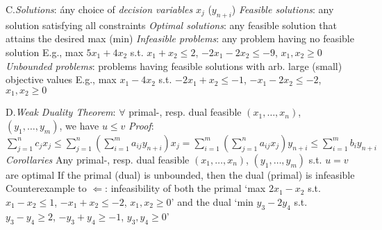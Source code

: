 \item{C.}\emph{Solutions}: \'any choice of \emph{decision variables} $x_j$
($y_{n+i}$)\smallskip
{}\emph{Feasible solutions}: any solution satisfying all constraints
\smallskip
{}\emph{Optimal solutions}: any feasible solution that attains the
desired max (min)\smallskip
{}\emph{Infeasible problems}: any problem having no feasible solution
\smallskip
{}E.g., max $5x_1+4x_2$ s.t. $x_1+x_2\leq 2$, $-2x_1-2x_2\leq-9$,
$x_1,x_2\geq 0$\smallskip
{}\emph{Unbounded problems}: problems having feasible solutions with
arb. large (small) objective values\smallskip
{}E.g., max $x_1-4x_2$ s.t. $-2x_1+x_2\leq -1$, $-x_1-2x_2\leq-2$,
$x_1,x_2\geq 0$\smallskip

\item{D.}\emph{Weak Duality Theorem}: $\forall$ primal-, resp. dual feasible
$(x_1,\ldots,x_n)$, $(y_1,\ldots,y_m)$, we have $u\leq v$\smallskip
{}\emph{Proof}: $\sum_{j=1}^nc_jx_j\leq\sum_{j=1}^n\left(\sum_{i=1}^m
a_{ij}y_{n+i}\right)x_j=\sum_{i=1}^m\left(\sum_{j=1}^na_{ij}x_j\right)y_{n+i}\leq
\sum_{i=1}^mb_iy_{n+i}$\smallskip
{}\emph{Corollaries}\smallskip
{}Any primal-, resp. dual feasible $(x_1,\ldots,x_n)$, $(y_1,\ldots,
y_m)$ s.t. $u=v$ are optimal\smallskip
{}If the primal (dual) is unbounded, then the dual (primal) is
infeasible\smallskip
{}Counterexample to $\Leftarrow$: infeasibility of both the primal
`max $2x_1-x_2$ s.t. $x_1-x_2\leq 1$, $-x_1+x_2\leq -2$, $x_1,x_2\geq 0$' and
the dual `min $y_3-2y_4$ s.t. $y_3-y_4\geq 2$, $-y_3+y_4\geq -1$, $y_3,y_4\geq
0$'\smallskip

\vfill\eject
